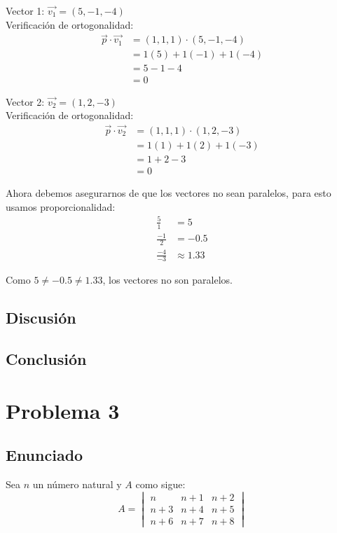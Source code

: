\documentclass{article}
\begin{document}
Vector 1: $\vec{v_1} = (5,-1,-4)$ \\
Verificación de ortogonalidad: \\
\begin{align}
\vec{p} \cdot \vec{v_1} &= (1, 1, 1) \cdot (5, -1, -4) \\
&= 1(5) + 1(-1) + 1(-4) \\
&= 5 - 1 - 4 \\
&= 0
\end{align}

Vector 2: $\vec{v_2} = (1, 2, -3)$ \\
Verificación de ortogonalidad: \\
\begin{align}
\vec{p} \cdot \vec{v_2} &= (1, 1, 1) \cdot (1, 2, -3) \\
&= 1(1) + 1(2) + 1(-3) \\
&= 1 + 2 - 3 \\
&= 0
\end{align}

Ahora debemos asegurarnos de que los vectores no sean paralelos, para esto usamos proporcionalidad:
\begin{align}
\frac{5}{1} &= 5 \\
\frac{-1}{2} &= -0.5 \\
\frac{-4}{-3} &\approx 1.33
\end{align}

Como $5 \neq -0.5 \neq 1.33$, los vectores no son paralelos.

\subsection{Discusión}

\subsection{Conclusión}

\section{Problema 3}

\subsection{Enunciado}
Sea $n$ un número natural y $A$ como sigue:
$$A = \begin{vmatrix}
n & n+1 & n+2 \\
n+3 & n+4 & n+5 \\
n+6 & n+7 & n+8
\end{vmatrix}$$
\end{document}
